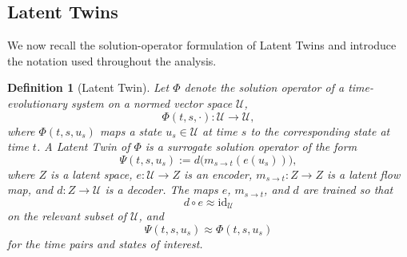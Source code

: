 \documentclass[a4paper,fleqn]{cas-sc}
\theoremstyle{thmstyleone}%
\theoremstyle{thmstyletwo}%
\theoremstyle{thmstylethree}%
\newtheorem{definition}{Definition}%
\begin{document}
\subsection{Latent Twins}
\label{sec:latent-twins}

We now recall the solution-operator formulation of Latent Twins and introduce the notation used throughout the analysis.

\begin{definition}[Latent Twin]\label{def:latenttwin}
Let $\Phi$ denote the solution operator of a time-evolutionary system on a normed vector space $\mathcal U$,
\[
    \Phi(t,s,\cdot):\mathcal U\to \mathcal U,
\]
where $\Phi(t,s,u_s)$ maps a state $u_s\in\mathcal U$ at time $s$ to the corresponding state at time $t$. A \emph{Latent Twin} of $\Phi$ is a surrogate solution operator of the form
\begin{equation}\label{eq:latenttwinfinite}
    \Psi(t,s,u_s) := d\bigl(m_{s\to t}(e(u_s))\bigr),
\end{equation}
where $Z$ is a latent space, $e:\mathcal U\to Z$ is an encoder, $m_{s\to t}:Z\to Z$ is a latent flow map, and $d:Z\to\mathcal U$ is a decoder. The maps $e$, $m_{s\to t}$, and $d$ are trained so that
$$
    d\circ e \approx \mathrm{id}_{\mathcal U}
$$
on the relevant subset of $\mathcal U$, and
$$
    \Psi(t,s,u_s)\approx \Phi(t,s,u_s)
$$
for the time pairs and states of interest.
\end{definition}
\end{document}
